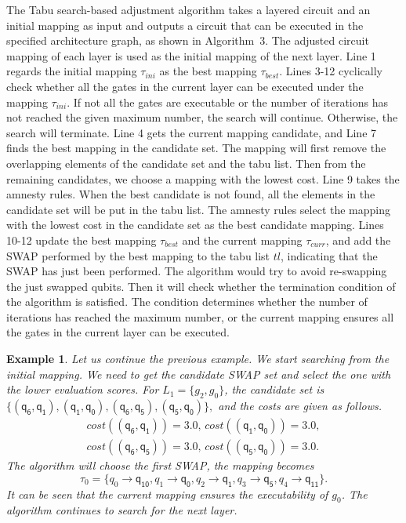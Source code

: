 \documentclass[journal]{IEEEtran}
\newtheorem{example}{Example}
\begin{document}
	The Tabu search-based adjustment algorithm takes a layered circuit and an initial mapping as input and outputs a circuit that can be executed in the specified architecture graph, as shown in Algorithm~3. %
	The adjusted circuit mapping of each layer is used as the initial mapping of the next layer. 
	Line 1 regards the initial mapping $\tau_{ini}$ as the best mapping $\tau_{best}$. Lines 3-12 cyclically check whether all the gates in the current layer can be executed under the mapping $\tau_{ini}$. If not all the gates are executable or the number of iterations has not reached the given maximum number, the search will continue. Otherwise, the search will terminate. Line 4 gets the current mapping candidate, and Line 7 finds the best mapping in the candidate set. The mapping will first remove the overlapping elements of the candidate set and the tabu list. Then from the remaining candidates, we choose a mapping with the lowest cost. Line 9 takes the amnesty rules. When the best candidate is not found, all the elements in the candidate set will be put in the tabu list.  The amnesty rules select the mapping with the lowest cost in the candidate set as the best candidate mapping. Lines 10-12 update the best mapping $\tau_{best}$ and the current mapping $\tau_{curr}$, and add the SWAP performed by the best mapping to the tabu list $tl$, indicating that the SWAP has just been performed. 
	The algorithm would try to avoid re-swapping the just swapped qubits. Then it will check whether the termination condition of the algorithm is satisfied. The condition determines whether the number of iterations has reached the maximum number, or the current mapping ensures all the gates in the current layer can be executed. 
\begin{example}
Let us continue the previous example. We start searching from the initial mapping. We need to get the candidate SWAP set and select the one with the lower evaluation scores.
For $L_{1}=\{g_{2},g_{0}\}$, the candidate set is 
$\{(\textsf{q}_\textsf{6},\textsf{q}_\textsf{1}), (\textsf{q}_\textsf{1},\textsf{q}_\textsf{0}), (\textsf{q}_\textsf{6},\textsf{q}_\textsf{5}), (\textsf{q}_\textsf{5},\textsf{q}_\textsf{0}) \} , $ and the costs are given as follows.
\[\begin{array}{l}
cost((\textsf{q}_\textsf{6},\textsf{q}_\textsf{1}))=3.0, \, cost((\textsf{q}_\textsf{1},\textsf{q}_\textsf{0}))=3.0,\\ cost((\textsf{q}_\textsf{6},\textsf{q}_\textsf{5}))=3.0, \, cost((\textsf{q}_\textsf{5},\textsf{q}_\textsf{0}))=3.0 .
\end{array}\]
The algorithm will choose the first SWAP, the mapping becomes $$\tau_{0}=\{\textit{q}_\textit{0}\rightarrow  \textsf{q}_\textsf{10},\textit{q}_\textit{1}\rightarrow  \textsf{q}_\textsf{0},
\textit{q}_\textit{2}\rightarrow  \textsf{q}_\textsf{1},\textit{q}_\textit{3}\rightarrow  \textsf{q}_\textsf{5},\textit{q}_\textit{4}\rightarrow  \textsf{q}_\textsf{11}\} . $$ 
 It can be seen that the current mapping ensures the executability of $g_{0}$. The algorithm continues to search for the next layer.
\end{example}
\end{document}
